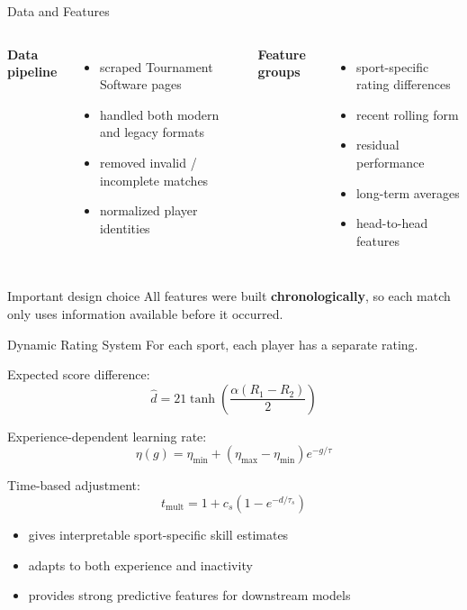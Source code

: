 \documentclass[aspectratio=169,11pt]{beamer}
\begin{document}
\begin{frame}{Data and Features}
    \begin{columns}[T,onlytextwidth]
        \textbf{Data pipeline}
        \begin{itemize}
            \item scraped Tournament Software pages
            \item handled both modern and legacy formats
            \item removed invalid / incomplete matches
            \item normalized player identities
        \end{itemize}

        \textbf{Feature groups}
        \begin{itemize}
            \item sport-specific rating differences
            \item recent rolling form
            \item residual performance
            \item long-term averages
            \item head-to-head features
        \end{itemize}
    \end{columns}

    \vspace{0.6em}

    \begin{block}{Important design choice}
        All features were built \textbf{chronologically}, so each match only uses information available before it occurred.
    \end{block}
\end{frame}

\begin{frame}{Dynamic Rating System}
    For each sport, each player has a separate rating.

    \vspace{0.3em}

    Expected score difference:
    \[
        \hat{d} = 21 \tanh\left(\frac{\alpha (R_1 - R_2)}{2}\right)
    \]

    Experience-dependent learning rate:
    \[
        \eta(g) = \eta_{\min} + (\eta_{\max} - \eta_{\min}) e^{-g/\tau}
    \]

    Time-based adjustment:
    \[
        t_{\mathrm{mult}} = 1 + c_s \left(1 - e^{-d/\tau_s}\right)
    \]

    \vspace{0.4em}

    \begin{itemize}
        \item gives interpretable sport-specific skill estimates
        \item adapts to both experience and inactivity
        \item provides strong predictive features for downstream models
    \end{itemize}
\end{frame}
\end{document}
